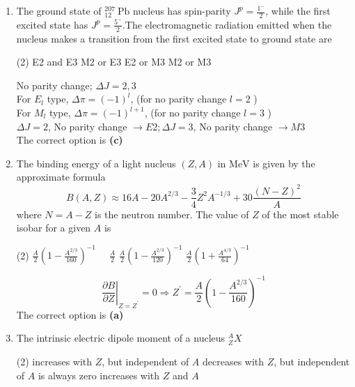 \begin{enumerate}
	\item The ground state of ${ }_{12}^{207} \mathrm{~Pb}$ nucleus has spin-parity $J^{p}=\frac{1^{-}}{2}$, while the first excited state has $J^{p}=\frac{5^{-}}{2}$.The electromagnetic radiation emitted when the nucleus makes a transition from the first excited state to ground state are
{}\\
\begin{tasks}(2)
	\task[\textbf{A.}] E2 and E3
	\task[\textbf{B.}] M2 or E3
	\task[\textbf{C.}] E2 or M3
	\task[\textbf{D.}] M2 or M3
\end{tasks}
\begin{answer}
 No parity change; $\Delta J=2,3$\\
For $E_{l}$ type, $\Delta \pi=(-1)^{l}$, (for no parity change $l=2$ )\\
For $M_{l}$ type, $\Delta \pi=(-1)^{l+1}$, (for no parity change $l=3$ )\\
$\Delta J=2$, No parity change $\rightarrow E 2 ; \Delta J=3$, No parity change $\rightarrow M 3$\\
The correct option is \textbf{(c)}	
\end{answer}
\item The binding energy of a light nucleus $(Z, A)$ in $\mathrm{MeV}$ is given by the approximate formula
$$
B(A, Z) \approx 16 A-20 A^{2 / 3}-\frac{3}{4} Z^{2} A^{-1 / 3}+30 \frac{(N-Z)^{2}}{A}
$$
where $N=A-Z$ is the neutron number. The value of $Z$ of the most stable isobar for a given $A$ is
{}
\begin{tasks}(2)
	\task[\textbf{A.}] $\frac{A}{2}\left(1-\frac{A^{2 / 3}}{160}\right)^{-1} \quad$  
	\task[\textbf{B.}]$\frac{A}{2}$
	\task[\textbf{C.}]$\frac{A}{2}\left(1-\frac{A^{2 / 3}}{120}\right)^{-1}$
	\task[\textbf{D.}]$\frac{A}{2}\left(1+\frac{A^{4 / 3}}{64}\right)^{-1}$
\end{tasks}
\begin{answer}
	$$\left.\frac{\partial B}{\partial Z}\right|_{Z=Z^{\prime}}=0 \Rightarrow Z^{\prime}=\frac{A}{2}\left(1-\frac{A^{2 / 3}}{160}\right)^{-1}$$
	The correct option is \textbf{(a)}
\end{answer}
\item The intrinsic electric dipole moment of a nucleus ${ }_{Z}^{A} X$
{}
\begin{tasks}(2)
	\task[\textbf{A.}] increases with $Z$, but independent of $A$
	\task[\textbf{B.}]decreases with $Z$, but independent of $A$
	\task[\textbf{C.}]is always zero
	\task[\textbf{D.}]increases with $Z$ and $A$

\end{tasks}
\end{enumerate}
